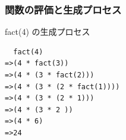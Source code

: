 \begin{frame}[fragile]
\frametitle{関数の評価と生成プロセス}
  \begin{itembox}{fact(4) の生成プロセス}
    \begin{verbatim}
  fact(4)
=>(4 * fact(3))
=>(4 * (3 * fact(2)))
=>(4 * (3 * (2 * fact(1))))
=>(4 * (3 * (2 * 1)))
=>(4 * (3 * 2 ))
=>(4 * 6)
=>24
    \end{verbatim}
  \end{itembox}
\end{frame}
